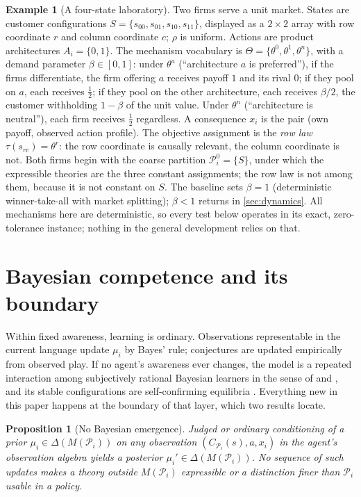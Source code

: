 \documentclass[11pt]{article}
\newtheorem{proposition}[assumption]{Proposition}
\theoremstyle{definition}
\newtheorem{example}{Example}
\begin{document}
\begin{example}[A four-state laboratory]
\label{ex:setup}
Two firms serve a unit market.
States are customer configurations $S=\{s_{00},s_{01},s_{10},s_{11}\}$, displayed as a $2\times2$ array with row coordinate $r$ and column coordinate $c$; $\rho$ is uniform.
Actions are product architectures $A_i=\{0,1\}$.
The mechanism vocabulary is $\Theta=\{\theta^0,\theta^1,\theta^n\}$, with a demand parameter $\beta\in[0,1]$: under $\theta^a$ (``architecture $a$ is preferred''), if the firms differentiate, the firm offering $a$ receives payoff $1$ and its rival $0$; if they pool on $a$, each receives $\tfrac12$; if they pool on the other architecture, each receives $\beta/2$, the customer withholding $1-\beta$ of the unit value.
Under $\theta^n$ (``architecture is neutral''), each firm receives $\tfrac12$ regardless.
A consequence $x_i$ is the pair (own payoff, observed action profile).
The objective assignment is the \emph{row law} $\tau(s_{rc})=\theta^{r}$: the row coordinate is causally relevant, the column coordinate is not.
Both firms begin with the coarse partition $\mathcal P_i^0=\{S\}$, under which the expressible theories are the three constant assignments; the row law is not among them, because it is not constant on $S$.
The baseline sets $\beta=1$ (deterministic winner-take-all with market splitting); $\beta<1$ returns in \cref{sec:dynamics}.
All mechanisms here are deterministic, so every test below operates in its exact, zero-tolerance instance; nothing in the general development relies on that.
\end{example}
\section{Bayesian competence and its boundary}
\label{sec:bayesian}

Within fixed awareness, learning is ordinary.
Observations representable in the current language update $\mu_i$ by Bayes' rule; conjectures are updated empirically from observed play.
If no agent's awareness ever changes, the model is a repeated interaction among subjectively rational Bayesian learners in the sense of \citet{KalaiLehrer1993b} and \citet{Ryall2003}, and its stable configurations are self-confirming equilibria \citep{FudenbergLevine1993}.
Everything new in this paper happens at the boundary of that layer, which two results locate.

\begin{proposition}[No Bayesian emergence]
\label{prop:no-emergence}
Judged or ordinary conditioning of a prior $\mu_i\in\Delta(M(\mathcal P_i))$ on any observation $(C_{\mathcal P_i}(s),a,x_i)$ in the agent's observation algebra yields a posterior $\mu_i'\in\Delta(M(\mathcal P_i))$.
No sequence of such updates makes a theory outside $M(\mathcal P_i)$ expressible or a distinction finer than $\mathcal P_i$ usable in a policy.
\end{proposition}
\end{document}
